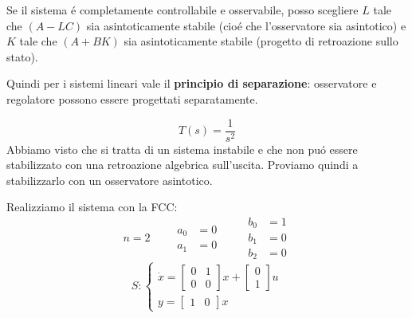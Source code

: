 \documentclass[../main.tex]{subfiles}
\begin{document}
		Se il sistema \'e completamente controllabile e osservabile, posso scegliere $ L $ tale che $ (A-LC) $ sia asintoticamente stabile (cio\'e che l'osservatore sia asintotico) e $ K $ tale che $ (A+BK) $ sia asintoticamente stabile (progetto di retroazione sullo stato).
		
		Quindi per i sistemi lineari vale il \textbf{principio di separazione}: osservatore e regolatore possono essere progettati separatamente.
		
		\begin{mdframed}[style=Exercise]
			\begin{Exercise}[title={Stabilizzazione di un sistema con osservatore}, difficulty=1]
				\[
					T(s) = \dfrac{1}{s^2}
				\]
				Abbiamo visto che si tratta di un sistema instabile e che non pu\'o essere stabilizzato con una retroazione algebrica sull'uscita. Proviamo quindi a stabilizzarlo con un osservatore asintotico.
				
				Realizziamo il sistema con la FCC:
				\[
					n = 2
					\qquad
					\begin{aligned}
						a_0 &= 0\\
						a_1 &= 0
					\end{aligned}
					\qquad
					\begin{aligned}
						b_0 &= 1\\
						b_1 &= 0\\
						b_2 &= 0
					\end{aligned}
				\]
				\[
					S:
					\begin{cases}
						\dot x =
						\begin{bmatrix}
							0 & 1\\
							0 & 0
						\end{bmatrix} x+
						\begin{bmatrix}
							0\\
							1
						\end{bmatrix} u
						\\[1em]
						y =
						\begin{bmatrix}
							1 & 0
						\end{bmatrix} x
					\end{cases}
				\]
				

\end{Exercise}
\end{mdframed}
\end{document}
